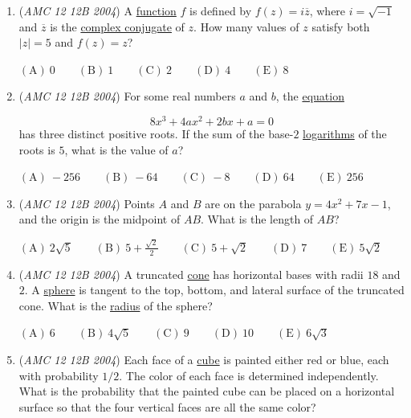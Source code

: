 \begin{enumerate}
 $\mathrm{(A) \ } 9 \qquad \mathrm{(B) \ } 18 \qquad \mathrm{(C) \ } 27 \qquad \mathrm{(D) \ } 36\qquad \mathrm{(E) \ } 45$


	\item (\textit{AMC 12 12B 2004}) A \href{https://artofproblemsolving.com/wiki/index.php?title=Function}{function} $f$ is defined by $f(z) = i\overline{z}$, where $i=\sqrt{-1}$ and $\overline{z}$ is the \href{https://artofproblemsolving.com/wiki/index.php?title=Complex\_conjugate}{complex conjugate} of $z$. How many values of $z$ satisfy both $|z| = 5$ and $f(z) = z$?


 $\mathrm{(A)}\ 0 \qquad\mathrm{(B)}\ 1 \qquad\mathrm{(C)}\ 2  \qquad\mathrm{(D)}\ 4 \qquad\mathrm{(E)}\ 8$


	\item (\textit{AMC 12 12B 2004}) For some real numbers $a$ and $b$, the \href{https://artofproblemsolving.com/wiki/index.php?title=Equation}{equation}

 \[8x^3 + 4ax^2 + 2bx + a = 0\]
has three distinct positive roots. If the sum of the base-$2$ \href{https://artofproblemsolving.com/wiki/index.php?title=Logarithm}{logarithms} of the roots is $5$, what is the value of $a$? 


 $\mathrm{(A)}\ -256 \qquad\mathrm{(B)}\ -64  \qquad\mathrm{(C)}\ -8 \qquad\mathrm{(D)}\ 64  \qquad\mathrm{(E)}\ 256$


	\item (\textit{AMC 12 12B 2004}) Points $A$ and $B$ are on the parabola $y=4x^2+7x-1$, and the origin is the midpoint of $AB$. What is the length of $AB$?


 $\mathrm{(A)}\ 2\sqrt5 \qquad \mathrm{(B)}\ 5+\frac{\sqrt2}{2} \qquad \mathrm{(C)}\ 5+\sqrt2 \qquad \mathrm{(D)}\ 7 \qquad \mathrm{(E)}\ 5\sqrt2$


	\item (\textit{AMC 12 12B 2004}) A truncated \href{https://artofproblemsolving.com/wiki/index.php?title=Cone}{cone} has horizontal bases with radii $18$ and $2$. A \href{https://artofproblemsolving.com/wiki/index.php?title=Sphere}{sphere} is tangent to the top, bottom, and lateral surface of the truncated cone. What is the \href{https://artofproblemsolving.com/wiki/index.php?title=Radius}{radius} of the sphere? 


 $\mathrm{(A)}\ 6 \qquad\mathrm{(B)}\ 4\sqrt{5} \qquad\mathrm{(C)}\ 9 \qquad\mathrm{(D)}\ 10 \qquad\mathrm{(E)}\ 6\sqrt{3}$


	\item (\textit{AMC 12 12B 2004}) Each face of a \href{https://artofproblemsolving.com/wiki/index.php?title=Cube}{cube} is painted either red or blue, each with probability $1/2$. The color of each face is determined independently. What is the probability that the painted cube can be placed on a horizontal surface so that the four vertical faces are all the same color?



\end{enumerate}
